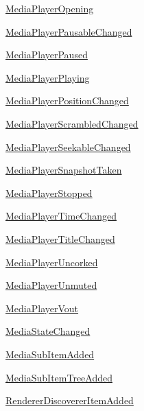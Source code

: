 \begin{DoxyCompactItemize}
\item 
\hyperlink{classvlc_1_1_event_type_a90a516ba35a85efd497bc0e306d7448d}{Media\+Player\+Opening}
\item 
\hyperlink{classvlc_1_1_event_type_af56a5bdbcf10b23076d64966ebb258bf}{Media\+Player\+Pausable\+Changed}
\item 
\hyperlink{classvlc_1_1_event_type_ac92a02f3065c00b9b8b0a3882350fa93}{Media\+Player\+Paused}
\item 
\hyperlink{classvlc_1_1_event_type_a041d474131f9ec0ba96245539f8953ec}{Media\+Player\+Playing}
\item 
\hyperlink{classvlc_1_1_event_type_ac533c455b9b071e0772f48f0bdbe4fc4}{Media\+Player\+Position\+Changed}
\item 
\hyperlink{classvlc_1_1_event_type_ae4dce8bc7bce048a430ce3a0d7b2ec5d}{Media\+Player\+Scrambled\+Changed}
\item 
\hyperlink{classvlc_1_1_event_type_a1b917626d55795d161047d81bab08a86}{Media\+Player\+Seekable\+Changed}
\item 
\hyperlink{classvlc_1_1_event_type_a522912a83df0bbd7931737607ce4f5b9}{Media\+Player\+Snapshot\+Taken}
\item 
\hyperlink{classvlc_1_1_event_type_a7df84ce532b15b3b81d21f8fd81d73c5}{Media\+Player\+Stopped}
\item 
\hyperlink{classvlc_1_1_event_type_a7eb37f428265a73742fe5620eab4a1e2}{Media\+Player\+Time\+Changed}
\item 
\hyperlink{classvlc_1_1_event_type_a031d03940c137c7455c627f26473e300}{Media\+Player\+Title\+Changed}
\item 
\hyperlink{classvlc_1_1_event_type_ae9aec863a44069a977b8d62326a49829}{Media\+Player\+Uncorked}
\item 
\hyperlink{classvlc_1_1_event_type_a7b872963905e8b525b7fb94d2038d60f}{Media\+Player\+Unmuted}
\item 
\hyperlink{classvlc_1_1_event_type_a55f81aa11f4330df58265b1c8f5d3a4d}{Media\+Player\+Vout}
\item 
\hyperlink{classvlc_1_1_event_type_aec130b5c9746589950ac3194fdf4269c}{Media\+State\+Changed}
\item 
\hyperlink{classvlc_1_1_event_type_a8483a529ad1bb84ecb41a3328f6c0e90}{Media\+Sub\+Item\+Added}
\item 
\hyperlink{classvlc_1_1_event_type_a58231cea0036c5572cf6f2232ed4f5da}{Media\+Sub\+Item\+Tree\+Added}
\item 
\hyperlink{classvlc_1_1_event_type_a1b9c4cc1c0b2d048930e2a81061ae410}{Renderer\+Discoverer\+Item\+Added}

\end{DoxyCompactItemize}
